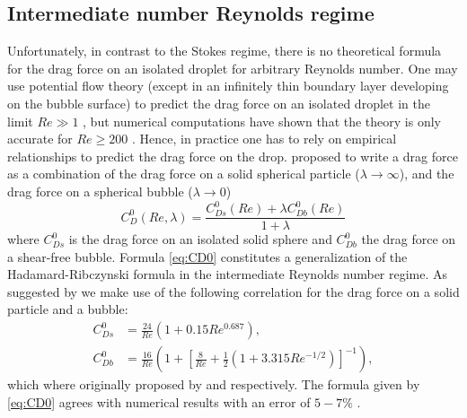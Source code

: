 \subsection{Intermediate number Reynolds regime}




Unfortunately, in contrast to the Stokes regime, there is no theoretical formula for the drag force on an isolated droplet for arbitrary Reynolds number. One may use potential flow theory (except in an infinitely thin boundary layer developing on the bubble surface) to predict the drag force on an isolated droplet in the limit  $Re\gg 1$ \citep{harper1968}, but numerical computations have shown that the theory is only accurate for $Re\geq 200$ \citep{dandy1989}.
Hence, in practice one has to rely on empirical relationships to predict the drag force on the drop. \citet{rivkind1976flow} proposed to write a drag force as a combination of the drag force on a solid spherical particle ($\lambda \rightarrow \infty$), and the drag force on a spherical bubble ($\lambda \rightarrow 0$)
\begin{equation}
C_D^0(Re,\lambda) = \frac{C_{Ds}^0(Re)+\lambda C_{Db}^0(Re)}{1+\lambda}
\label{eq:CD0}
\end{equation}
where $C_{Ds}^0$ is the drag force on an isolated solid sphere and $C_{Db}^0$ the drag force on a shear-free bubble. 
Formula \ref{eq:CD0} constitutes a generalization of the Hadamard-Ribczynski formula in the intermediate Reynolds number regime. 
As suggested by \citet{magnaudet1997forces} we make use of the following correlation for the drag force on a solid particle and a bubble: 
\begin{align}
    \label{eq:shiller_neuman}
C_{Ds} ^0 &= \frac{24}{Re}(1+0.15Re^{0.687}), \\
C_{Db} ^0 &= \frac{16}{Re}\left(1+\left[\frac{8}{Re}+\frac{1}{2}\left(1+3.315Re^{-1/2}\right)\right]^{-1}\right),
\label{eq:mei}
\end{align}
which where originally proposed by \citet{schiller1933} and \citet{mei1994} respectively. 
The formula given by \ref{eq:CD0} agrees with numerical results with an error of $5-7\%$ \citep{rivkind1976flow}.



